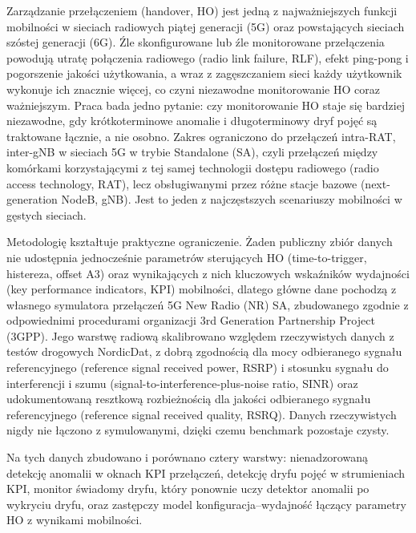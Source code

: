 {}{

Zarządzanie przełączeniem (handover, HO) jest jedną z najważniejszych funkcji
mobilności w sieciach radiowych piątej generacji (5G) oraz powstających
sieciach szóstej generacji (6G). Źle
skonfigurowane lub źle monitorowane przełączenia powodują utratę połączenia
radiowego (radio link failure, RLF), efekt ping-pong i pogorszenie jakości użytkowania, a wraz z
zagęszczaniem sieci każdy użytkownik wykonuje ich znacznie więcej, co czyni
niezawodne monitorowanie HO coraz ważniejszym. Praca bada jedno pytanie: czy
monitorowanie HO staje się bardziej niezawodne, gdy krótkoterminowe anomalie i
długoterminowy dryf pojęć są traktowane łącznie, a nie osobno. Zakres ograniczono
do przełączeń intra-RAT, inter-gNB w sieciach 5G w trybie Standalone (SA), czyli
przełączeń między komórkami korzystającymi z tej samej technologii dostępu
radiowego (radio access technology, RAT), lecz obsługiwanymi przez różne stacje
bazowe (next-generation NodeB, gNB). Jest to jeden z najczęstszych scenariuszy
mobilności w gęstych sieciach.

Metodologię kształtuje praktyczne ograniczenie. Żaden publiczny zbiór danych nie
udostępnia jednocześnie parametrów sterujących HO (time-to-trigger, histereza,
offset A3) oraz wynikających z nich kluczowych wskaźników wydajności (key
performance indicators, KPI) mobilności, dlatego główne dane pochodzą z własnego
symulatora przełączeń 5G New Radio (NR) SA, zbudowanego zgodnie z odpowiednimi
procedurami organizacji 3rd Generation Partnership Project (3GPP). Jego warstwę radiową skalibrowano względem
rzeczywistych danych z testów drogowych NordicDat, z dobrą zgodnością dla mocy
odbieranego sygnału referencyjnego (reference signal received power, RSRP) i
stosunku sygnału do interferencji i szumu (signal-to-interference-plus-noise
ratio, SINR) oraz udokumentowaną resztkową rozbieżnością dla jakości odbieranego
sygnału referencyjnego (reference signal received quality, RSRQ). Danych
rzeczywistych
nigdy nie łączono z symulowanymi, dzięki czemu benchmark pozostaje czysty.

Na tych danych zbudowano i porównano cztery warstwy: nienadzorowaną detekcję
anomalii w oknach KPI przełączeń, detekcję dryfu pojęć w strumieniach KPI,
monitor świadomy dryfu, który ponownie uczy detektor anomalii po wykryciu
dryfu, oraz zastępczy model konfiguracja--wydajność łączący parametry HO z
wynikami mobilności.

}

